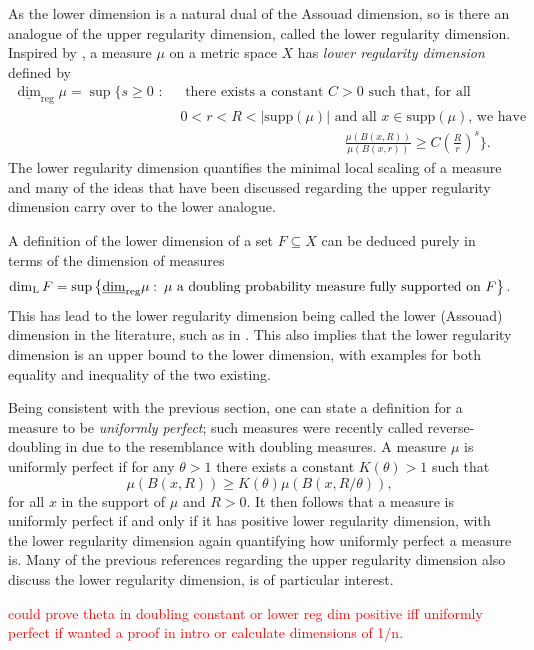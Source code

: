 As the lower dimension is a natural dual of the Assouad dimension, so is there an analogue of the upper regularity dimension, called the lower regularity dimension. Inspired by \cite{bylund}, a measure $\mu$ on a metric space $X$ has \textit{lower regularity dimension} defined by 
\begin{align*} 
\underline{\dim}_{\text{reg}} \mu = \sup \Bigg\{ s \geq 0 \, \,  : \,  &\,\text{ there exists a  constant }C  > 0\text{  such that, for all }  \\ & \, 0< r< R < \lvert \text{supp}(\mu)    \rvert \text{  and all $x \in \text{supp} (\mu)$, we have }  \\  & \hspace{5cm} \frac{\mu(B(x,R))}{\mu(B(x,r))} \geq C\left(\frac{R}{r}\right)^{s} \Bigg\}.
\end{align*}
The lower regularity dimension quantifies the minimal local scaling of a measure and many of the ideas that have been discussed regarding the upper regularity dimension carry over to the lower analogue. 

A definition of the lower dimension of a set $F\subseteq X$ can be deduced purely in terms of the dimension of measures
\begin{equation}
    \dim_{\text{L}} F = \sup \left\{ \underline{\dim}_{\textup{reg}} \mu \,  \colon \, \mu \text{ a doubling probability measure fully supported on } F\right\}.
\end{equation}
This has lead to the lower regularity dimension being called the lower (Assouad) dimension in the literature, such as in \cite{hare-troscheit}. This also implies that the lower regularity dimension is an upper bound to the lower dimension, with examples for both equality and inequality of the two existing.

Being consistent with the previous section, one can state a definition for a measure to be \textit{uniformly perfect}; such measures were recently called reverse-doubling in \cite{anti2} due to the resemblance with doubling measures. A measure $\mu$ is uniformly perfect if for any $\theta > 1$ there exists a constant $K(\theta) > 1$ such that 
\[
\mu(B(x,R)) \ge K(\theta) \mu(B(x,R/\theta)),
\]
for all $x$ in the support of $\mu$ and $R > 0$. It then follows that a measure is uniformly perfect if and only if it has positive lower regularity dimension, with the lower regularity dimension again quantifying how uniformly perfect a measure is. Many of the previous references regarding the upper regularity dimension also discuss the lower regularity dimension, \cite{hare-troscheit} is  of particular interest.


\textcolor{red}{could prove theta in doubling constant or lower reg dim positive iff uniformly perfect if wanted a proof in intro or calculate dimensions of 1/n.}


